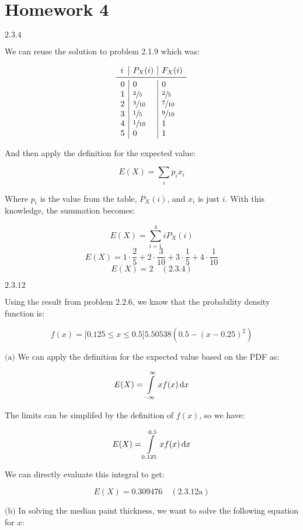 \documentclass{article}
\newcommand{\problem}[2]{$\boxed{\text{#1.#2}}$}
\newcommand{\subproblem}[3]{$\boxed{\text{(#3)}}$}
\newcommand{\solution}[3]{\boxed{#3\quad(\text{#1.#2})}}
\newcommand{\subsolution}[4]{\boxed{#4\quad(\text{#1.#2#3})}}
\renewcommand{\d}[1]{\,\textnormal{d}#1}
\begin{document}
\section*{Homework 4}

%
\problem{2.3}{4}

We can reuse the solution to problem 2.1.9 which was:

\[
\begin{array}{l|l|l}
i & P_X(i) & F_X(i) \\
\midrule
0 & 0 & 0 \\
1 & \sfrac{2}{5} & \sfrac{2}{5} \\
2 & \sfrac{3}{10} & \sfrac{7}{10} \\
3 & \sfrac{1}{5} & \sfrac{9}{10} \\
4 & \sfrac{1}{10} & 1 \\
5 & 0 & 1 \\
\end{array}
\]

And then apply the definition for the expected value:

\[
E(X)=\sum\limits_i p_i x_i
\]

Where $p_i$ is the value from the table, $P_X(i)$, and $x_i$ is just
$i$. With this knowledge, the summation becomes:

\[
E(X)=\sum\limits_{i=1}^4 iP_X(i)
\] \[
E(X)=1\cdot\frac{2}{5}+2\cdot\frac{3}{10}+3\cdot\frac{1}{5}+4\cdot\frac{1}{10}
\] \[
\solution{2.3}{4}{E(X)=2}
\]

%
\problem{2.3}{12}

Using the result from problem 2.2.6, we know that the probability
density function is:

\[
f(x)=\lbrack0.125\le x\le0.5\rbrack 5.50538\left(0.5-(x-0.25)^2\right)
\]

%
\subproblem{2.3}{12}{a} We can apply the definition for the expected value
based on the PDF as:

\[
E(X)=\int\limits_{-\infty}^\infty xf(x)\d{x}
\]

The limits can be simplifed by the definition of $f(x)$, so we have:

\[
E(X)=\int\limits_{0.125}^{0.5} xf(x)\d{x}
\]

We can directly evaluate this integral to get:

\[
\subsolution{2.3}{12}{a}{E(X)=0.309476}
\]

%
\subproblem{2.3}{12}{b} In solving the median paint thickness, we want
to solve the following equation for $x$:
\end{document}
